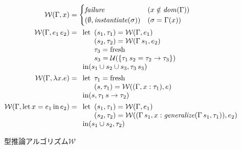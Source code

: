 \begin{figure}[htbp]
  \begin{align*}
    \mathcal W(\Gamma, x) &=
    \begin{cases}
      \mathit{failure} & (x \notin \mathit{dom}(\Gamma)) \\
      (\emptyset, \mathit{instantiate}(\sigma)) & (\sigma = \Gamma(x))
    \end{cases} \\
    \mathcal W(\Gamma, e_1 \, e_2) &=
    \begin{array}[t]{l}
      \mathrm{let}
        \begin{array}[t]{l}
          (s_1, \tau_1) = \mathcal W(\Gamma, e_1) \\
          (s_2, \tau_2) = \mathcal W(\Gamma \, s_1, e_2) \\
          \tau_3 = \mathrm{fresh} \\
          s_3 = \mathcal U(\{\tau_1 \, s_2 = \tau_2 \to \tau_3\})
        \end{array} \\
      \mathrm{in} (s_1 \cup s_2 \cup s_3, \tau_3 \, s_3)
    \end{array} \\
    \mathcal W(\Gamma, \lambda x. e) &=
    \begin{array}[t]{l}
      \mathrm{let}
        \begin{array}[t]{l}
          \tau_1 = \mathrm{fresh} \\
          (s, \tau_1) = \mathcal W((\Gamma, x : \tau_1), e) \\
        \end{array} \\
      \mathrm{in} (s, \tau_1 \, s \to \tau_2)
    \end{array} \\
    \mathcal W(\Gamma, \mathrm{let} \, x = e_1 \, \mathrm{in} \, e_2) &=
    \begin{array}[t]{l}
      \mathrm{let}
        \begin{array}[t]{l}
          (s_1, \tau_1) = \mathcal W(\Gamma, e_1) \\
          (s_2, \tau_2) =
            \mathcal W((\Gamma \, s_1, x : \mathit{generalize}(\Gamma \, s_1, \tau_1)), e_2) \\
        \end{array} \\
      \mathrm{in} (s_1 \cup s_2, \tau_2)
    \end{array}
  \end{align*}
  \caption{型推論アルゴリズム$\mathcal W$}
  \label{fig:algorithm-w}
\end{figure}

